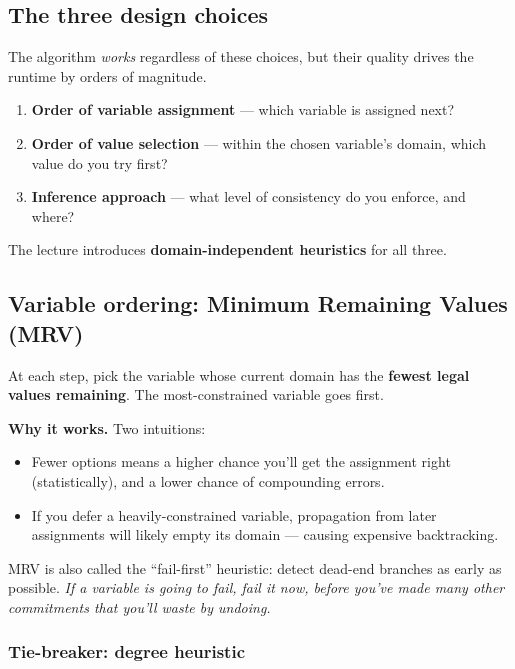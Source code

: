 \documentclass[11pt, a4paper]{article}
\begin{document}
\subsection{The three design choices}

The algorithm \emph{works} regardless of these choices, but their quality drives the runtime by orders of magnitude.

\begin{enumerate}
  \item \textbf{Order of variable assignment} — which variable is assigned next?
  \item \textbf{Order of value selection} — within the chosen variable's domain, which value do you try first?
  \item \textbf{Inference approach} — what level of consistency do you enforce, and where?
\end{enumerate}

The lecture introduces \textbf{domain-independent heuristics} for all three.

\subsection{Variable ordering: Minimum Remaining Values (MRV)}

\begin{defbox}
At each step, pick the variable whose current domain has the \textbf{fewest legal values remaining}. The most-constrained variable goes first.
\end{defbox}

\textbf{Why it works.} Two intuitions:
\begin{itemize}
  \item Fewer options means a higher chance you'll get the assignment right (statistically), and a lower chance of compounding errors.
  \item If you defer a heavily-constrained variable, propagation from later assignments will likely empty its domain — causing expensive backtracking.
\end{itemize}

MRV is also called the ``fail-first'' heuristic: detect dead-end branches as early as possible. \emph{If a variable is going to fail, fail it now, before you've made many other commitments that you'll waste by undoing.}

\subsubsection*{Tie-breaker: degree heuristic}
\end{document}
